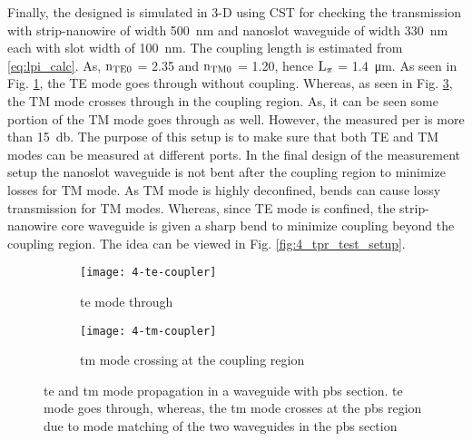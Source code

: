 \documentclass[../report.tex]{subfiles}
\begin{document}
\noindent Finally, the designed is simulated in 3-D using CST for checking the transmission with strip-nanowire of width \SI{500}{\nano \meter} and nanoslot waveguide of width \SI{330}{\nano \meter} each with slot width of \SI{100}{\nano \meter}. The coupling length is estimated from \ref{eq:lpi_calc}. As, $\mathrm{n_{TE0}}$ = 2.35 and $\mathrm{n_{TM0}}$ = 1.20, hence $\mathrm{L_{\pi}}$ = \SI{1.4}{\micro\meter}. As seen in Fig. \ref{fig:4_te_coupler}, the TE mode goes through without coupling. Whereas, as seen in Fig. \ref{fig:4_tm_coupler}, the TM mode crosses through in the coupling region. As, it can be seen some portion of the TM mode goes through as well. However, the measured \gls{per} is more than \SI{15}{\decibel}. The purpose of this setup is to make sure that both TE and TM modes can be measured at different ports. In the final design of the measurement setup the nanoslot waveguide is not bent after the coupling region to minimize losses for TM mode. As TM mode is highly deconfined, bends can cause lossy transmission for TM modes. Whereas, since TE mode is confined, the strip-nanowire core waveguide is given a sharp bend to minimize coupling beyond the coupling region. The idea can be viewed in Fig. \ref{fig:4_tpr_test_setup}.

\begin{figure}[H] %
	\begin{subfigure}[t]{0.45\textwidth}
		\texttt{[image: 4-te-coupler]}
		\caption{\gls{te} mode through}
		\label{fig:4_te_coupler}
	\end{subfigure}
	\hfill
	\begin{subfigure}[t]{0.45\textwidth}
		\texttt{[image: 4-tm-coupler]}
		\caption{\gls{tm} mode crossing at the coupling region}
		\label{fig:4_tm_coupler}
	\end{subfigure}
	\caption{\gls{te} and \gls{tm} mode propagation in a waveguide with \gls{pbs} section. \gls{te} mode goes through, whereas, the \gls{tm} mode crosses at the \gls{pbs} region due to mode matching of the two waveguides in the \gls{pbs} section}
\end{figure}
\end{document}
